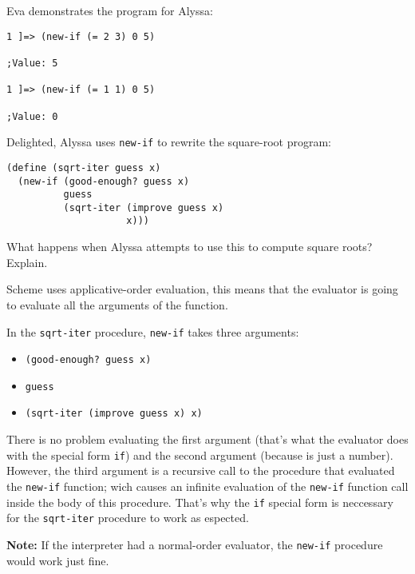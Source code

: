 \documentclass[letterpaper, leqno]{article}
\begin{document}
Eva demonstrates the program for Alyssa:

\begin{verbatim}
1 ]=> (new-if (= 2 3) 0 5)

;Value: 5

1 ]=> (new-if (= 1 1) 0 5)

;Value: 0
\end{verbatim}

Delighted, Alyssa uses \texttt{new-if} to rewrite the square-root program:

\begin{verbatim}
(define (sqrt-iter guess x)
  (new-if (good-enough? guess x)
          guess
          (sqrt-iter (improve guess x)
                     x)))
\end{verbatim}

What happens when Alyssa attempts to use this to compute square roots? Explain.



\textcolor{answer}{
  Scheme uses applicative-order evaluation, this means that the evaluator is going to evaluate all the arguments of the function.
}

\textcolor{answer}{
  In the \texttt{sqrt-iter} procedure, \texttt{new-if} takes three arguments:
}

{\color{answer}
  \begin{itemize}
  \item \texttt{(good-enough? guess x)}
  \item \texttt{guess}
  \item \texttt{(sqrt-iter (improve guess x) x)}
  \end{itemize}
}

\textcolor{answer}{
  There is no problem evaluating the first argument (that's what the evaluator does with the special form \texttt{if}) and the second argument (because is just a number). However, the third argument is a recursive call to the procedure that evaluated the \texttt{new-if} function; wich causes an infinite evaluation of the \texttt{new-if} function call inside the body of this procedure. That's why the \texttt{if} special form is neccessary for the \texttt{sqrt-iter} procedure to work as espected.
}

\textcolor{answer}{
  \textbf{Note:} If the interpreter had a normal-order evaluator, the \texttt{new-if} procedure would work just fine.
}
\end{document}
